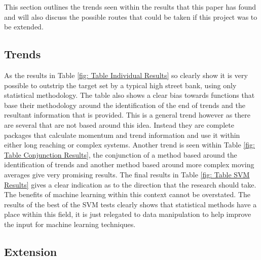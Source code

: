 \documentclass[conference]{IEEEtran}
\begin{document}

This section outlines the trends seen within the results that this paper has found and will also discuss the possible routes that could be taken if this project was to be extended.

\subsection{Trends}

As the results in Table \ref{fig: Table Individual Results} so clearly show it is very possible to outstrip the target set by a typical high street bank, using only statistical methodology. The table also shows a clear bias towards functions that base their methodology around the identification of the end of trends and the resultant information that is provided. This is a general trend however as there are several that are not based around this idea. Instead they are complete packages that calculate momentum and trend information and use it within either long reaching or complex systems. 
Another trend is seen within Table \ref{fig: Table Conjunction Results}, the conjunction of a method based around the identification of trends and another method based around more complex moving averages give very promising results. 
The final results in Table \ref{fig: Table SVM Results} gives a clear indication as to the direction that the research should take. The benefits of machine learning within this context cannot be overstated. The results of the best of the SVM tests clearly shows that statistical methods have a place within this field, it is just relegated to data manipulation to help improve the input for machine learning techniques.\\

\subsection{Extension}
\end{document}
